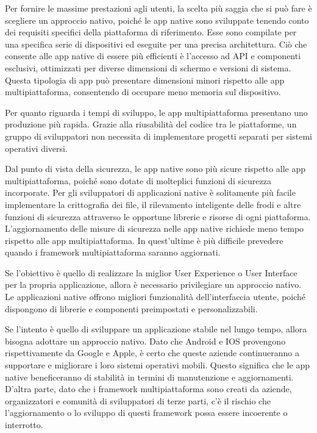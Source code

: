 Per fornire le massime prestazioni agli utenti, la scelta pi\`u saggia che si pu\`o fare \`e scegliere un approccio nativo, poich\'e
le app native sono sviluppate tenendo conto dei requisiti specifici della piattaforma di riferimento. Esse sono compilate per una specifica serie di dispositivi ed
eseguite per una precisa architettura. Ci\`o che consente alle app native di essere pi\`u efficienti \`e l'accesso ad API e componenti esclusivi, ottimizzati per diverse dimensioni di schermo e versioni di sistema.
Questa tipologia di app pu\`o presentare dimensioni minori rispetto alle app multipiattaforma, consentendo di occupare meno memoria sul dispositivo.

Per quanto riguarda i tempi di sviluppo, le app multipiattaforma presentano uno produzione pi\`u rapida. Grazie alla riusabilit\`a del codice tra le piattaforme, un gruppo di sviluppatori
non necessita di implementare progetti separati per sistemi operativi diversi.

Dal punto di vista della sicurezza, le app native sono pi\`u sicure rispetto alle app multipiattaforma, poich\'e sono dotate di molteplici funzioni di sicurezza incorporate.
Per gli sviluppatori di applicazioni native \`e solitamente pi\`u facile implementare la crittografia dei file, il rilevamento inteligente delle frodi e altre
funzioni di sicurezza attraverso le opportune librerie e risorse di ogni piattaforma.\\
L'aggiornamento delle misure di sicurezza nelle app native richiede meno tempo rispetto alle app multipiattaforma. In quest'ultime \`e pi\`u difficile prevedere quando i framework multipiattaforma saranno aggiornati.

Se l'obiettivo \`e quello di realizzare la miglior User Experience o User Interface per la propria applicazione, allora \`e necessario privilegiare un approccio nativo. Le applicazioni native offrono migliori funzionalit\`a
dell'interfaccia utente, poich\'e dispongono di librerie e componenti preimpostati e personalizzabili.

Se l'intento \`e quello di sviluppare un applicazione stabile nel lungo tempo, allora bisogna adottare un approccio nativo. Dato che Android e IOS provengono rispettivamente da Google e Apple,
\`e certo che queste aziende continueranno a supportare e migliorare i loro sistemi operativi mobili. Questo significa che le app native beneficeranno di stabilit\`a in termini di manutenzione e aggiornamenti.\\
D'altra parte, dato che i framework multipiattaforma sono creati da aziende, organizzatori e comunit\`a di sviluppatori di terze parti, c'\`e il rischio che l'aggiornamento o lo sviluppo di questi
framework possa essere incoerente o interrotto.




